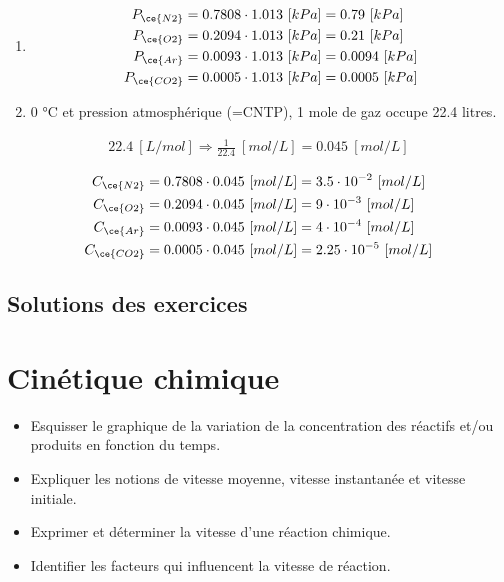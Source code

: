 \documentclass[
  11pt,
  a4paper,
  openany]{book}
\providecommand{\tightlist}{%
  \setlength{\itemsep}{0pt}\setlength{\parskip}{0pt}}
\begin{document}
\begin{Answer}

\begin{enumerate}
\def\labelenumi{\alph{enumi}.}
\tightlist
\item
  \[
  \begin{split}
   P_{\ce{N2}} &= 0.7808 \cdot 1.013\ [kPa] = 0.79\ [kPa] \\
   P_{\ce{O2}} &= 0.2094 \cdot 1.013\ [kPa] = 0.21\ [kPa] \\
   P_{\ce{Ar}} &= 0.0093 \cdot 1.013\ [kPa] = 0.0094\ [kPa] \\
   P_{\ce{CO2}} &= 0.0005 \cdot 1.013\ [kPa] = 0.0005\ [kPa]
  \end{split}
  \]
\item
  0 °C et pression atmosphérique (=CNTP), 1 mole de gaz occupe 22.4 litres.
\end{enumerate}

\[
\begin{split}
22.4\ [L/mol] \Rightarrow \frac{1}{22.4}\ [mol/L] = 0.045\ [mol/L]
\end{split}
\]

\[
\begin{split}
    C_{\ce{N2}} &= 0.7808 \cdot 0.045\ [mol/L] = 3.5 \cdot 10^{-2}\ [mol/L] \\
    C_{\ce{O2}} &= 0.2094 \cdot 0.045\ [mol/L] = 9 \cdot 10^{-3}\ [mol/L] \\
    C_{\ce{Ar}} &= 0.0093 \cdot 0.045\ [mol/L] = 4 \cdot 10^{-4}\ [mol/L] \\
    C_{\ce{CO2}} &= 0.0005 \cdot 0.045\ [mol/L] = 2.25 \cdot 10^{-5}\ [mol/L]
\end{split}
\]

\end{Answer}

\newpage

\section{Solutions des exercices} \shipoutAnswer

\hypertarget{cinuxe9tique-chimique}{%
\chapter{Cinétique chimique}\label{cinuxe9tique-chimique}}

\begin{objectives}

\begin{itemize}
\tightlist
\item
  Esquisser le graphique de la variation de la concentration des réactifs et/ou produits en fonction du temps.
\item
  Expliquer les notions de vitesse moyenne, vitesse instantanée et vitesse initiale.
\item
  Exprimer et déterminer la vitesse d'une réaction chimique.
\item
  Identifier les facteurs qui influencent la vitesse de réaction.
\end{itemize}

\end{objectives}
\end{document}
